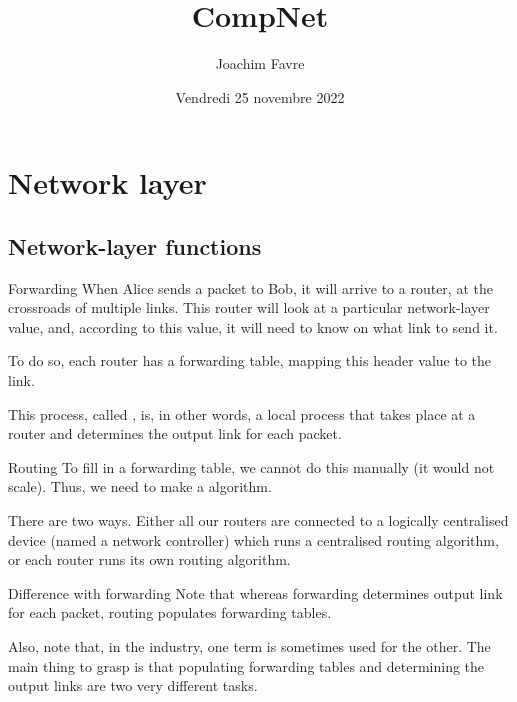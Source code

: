 \documentclass[a4paper]{article}
\title{CompNet}
\author{Joachim Favre}
\date{Vendredi 25 novembre 2022}
\begin{document}
\maketitle



\section{Network layer}
\subsection{Network-layer functions}
\begin{parag}{Forwarding}
    When Alice sends a packet to Bob, it will arrive to a router, at the crossroads of multiple links. This router will look at a particular network-layer value, and, according to this value, it will need to know on what link to send it.

    To do so, each router has a forwarding table, mapping this header value to the link.

    This process, called , is, in other words, a local process that takes place at a router and determines the output link for each packet.
\end{parag}

\begin{parag}{Routing}
    To fill in a forwarding table, we cannot do this manually (it would not scale). Thus, we need to make a  algorithm. 

    There are two ways. Either all our routers are connected to a logically centralised device (named a network controller) which runs a centralised routing algorithm, or each router runs its own routing algorithm.

    \begin{subparag}{Difference with forwarding}
        Note that whereas forwarding determines output link for each packet, routing populates forwarding tables. 

        Also, note that, in the industry, one term is sometimes used for the other. The main thing to grasp is that populating forwarding tables and determining the output links are two very different tasks.
    \end{subparag}
\end{parag}
\end{document}
